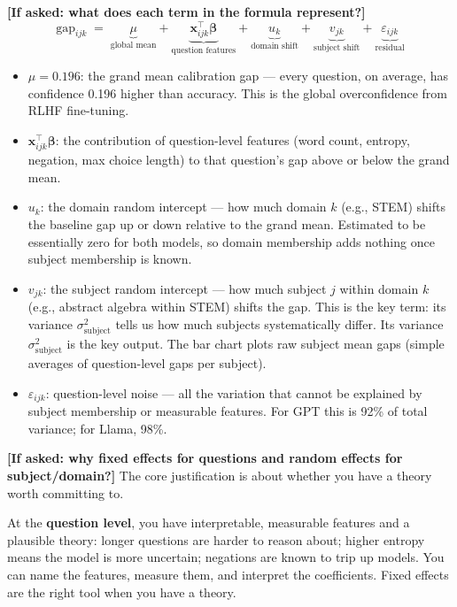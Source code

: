 \documentclass[aspectratio=169,11pt]{beamer}
\begin{document}
{  \textbf{[If asked: what does each term in the formula represent?]}
  \[
    \mathrm{gap}_{ijk} \;=\; \underbrace{\mu}_{\text{global mean}}
      + \underbrace{\mathbf{x}_{ijk}^\top \boldsymbol{\beta}}_{\text{question features}}
      + \underbrace{u_k}_{\text{domain shift}}
      + \underbrace{v_{jk}}_{\text{subject shift}}
      + \underbrace{\varepsilon_{ijk}}_{\text{residual}}
  \]
  \begin{itemize}
    \item $\mu = 0.196$: the grand mean calibration gap --- every question, on average,
      has confidence 0.196 higher than accuracy. This is the global overconfidence
      from RLHF fine-tuning.
    \item $\mathbf{x}_{ijk}^\top\boldsymbol{\beta}$: the contribution of question-level
      features (word count, entropy, negation, max choice length) to that question's
      gap above or below the grand mean.
    \item $u_k$: the domain random intercept --- how much domain $k$ (e.g., STEM)
      shifts the baseline gap up or down relative to the grand mean. Estimated to be
      essentially zero for both models, so domain membership adds nothing once
      subject membership is known.
    \item $v_{jk}$: the subject random intercept --- how much subject $j$ within
      domain $k$ (e.g., abstract algebra within STEM) shifts the gap. This is the
      key term: its variance $\sigma^2_\text{subject}$ tells us how much subjects
      systematically differ. Its variance $\sigma^2_\text{subject}$ is the key output.
      The bar chart plots raw subject mean gaps (simple averages of question-level gaps per subject).
    \item $\varepsilon_{ijk}$: question-level noise --- all the variation that cannot
      be explained by subject membership or measurable features. For GPT this is 92\%
      of total variance; for Llama, 98\%.
  \end{itemize}

  \textbf{[If asked: why fixed effects for questions and random effects for subject/domain?]}
  The core justification is about whether you have a theory worth committing to.

  At the \textbf{question level}, you have interpretable, measurable features and a
  plausible theory: longer questions are harder to reason about; higher entropy means
  the model is more uncertain; negations are known to trip up models. You can name
  the features, measure them, and interpret the coefficients. Fixed effects are the
  right tool when you have a theory.

}
\end{document}
